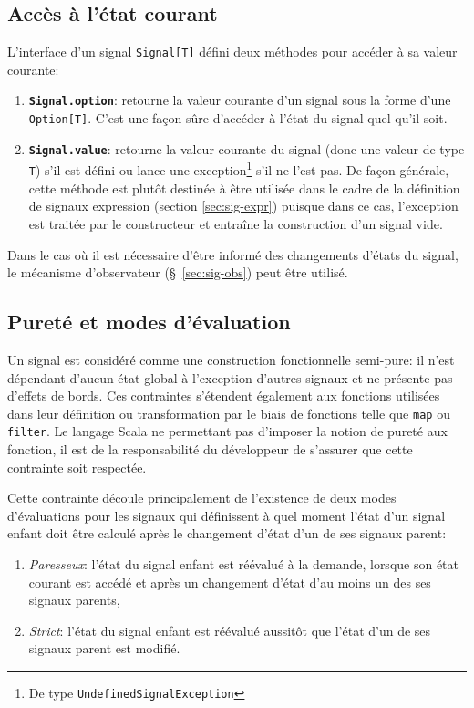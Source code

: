 \subsection{Accès à l'état courant}
L'interface d'un signal \texttt{Signal[T]} défini deux méthodes pour accéder à sa valeur courante:
\begin{enumerate}
	\item \textbf{\texttt{Signal.option}}: retourne la valeur courante d'un signal sous la forme d'une \texttt{Option[T]}. C'est une façon sûre d'accéder à l'état du signal quel qu'il soit.
	
	\item \textbf{\texttt{Signal.value}}: retourne la valeur courante du signal (donc une valeur de type \texttt{T}) s'il est défini ou lance une exception\footnote{De type \texttt{UndefinedSignalException}} s'il ne l'est pas. De façon générale, cette méthode est plutôt destinée à être utilisée dans le cadre de la définition de signaux expression (section \ref{sec:sig-expr}) puisque dans ce cas, l'exception est traitée par le constructeur et entraîne la construction d'un signal vide.
\end{enumerate}

Dans le cas où il est nécessaire d'être informé des changements d'états du signal, le mécanisme d'observateur (§~\ref{sec:sig-obs}) peut être utilisé.

\subsection{Pureté et modes d'évaluation} \label{sec:sig-pureness}
Un signal est considéré comme une construction fonctionnelle semi-pure: il n'est dépendant d'aucun état global à l'exception d'autres signaux et ne présente pas d'effets de bords. Ces contraintes s'étendent également aux fonctions utilisées dans leur définition ou transformation par le biais de fonctions telle que \texttt{map} ou \texttt{filter}. Le langage Scala ne permettant pas d'imposer la notion de pureté aux fonction, il est de la responsabilité du développeur de s'assurer que cette contrainte soit respectée.

Cette contrainte découle principalement de l'existence de deux modes d'évaluations pour les signaux qui définissent à quel moment l'état d'un signal enfant doit être calculé après le changement d'état d'un de ses signaux parent:
\begin{enumerate}
	\item \emph{Paresseux}: l'état du signal enfant est réévalué à la demande, lorsque son état courant est accédé et après un changement d'état d'au moins un des ses signaux parents,
	\item \emph{Strict}: l'état du signal enfant est réévalué aussitôt que l'état d'un de ses signaux parent est modifié.
\end{enumerate}


